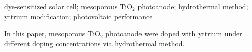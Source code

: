 \begin{abstract}{太阳能电池；多孔TiO$_2$光阳极；水热法；钇掺杂改性；光电性能}

本文利用刮涂法制备了多孔TiO$_2$纳米晶光阳极，并使用水热法对光阳极进行了不同浓度的钇掺杂改性。
\end{abstract}
\begin{abstractEn}{dye-sensitized solar cell; mesoporous TiO$_2$ photoanode; hydrothermal method; yttrium modification; photovoltaic performance}

In this paper, mesoporous TiO$_2$ photoanode were doped with yttrium under different doping concentrations via hydrothermal method.
\end{abstractEn}
